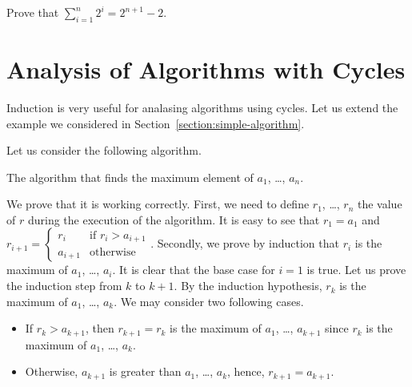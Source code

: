\begin{exercise}
  Prove that $\sum_{i = 1}^n 2^i = 2^{n + 1} - 2$.
\end{exercise}

\section{Analysis of Algorithms with Cycles}

Induction is very useful for analasing algorithms using cycles. Let us extend
the example we considered in Section~\ref{section:simple-algorithm}.

Let us consider the following algorithm.
\begin{algorithm}
  \begin{algorithmic}[1]
        \EndIf
      \EndFor
      \State{}
    \EndFunction
  \end{algorithmic}
  \caption{The algorithm that finds the maximum element of $a_1$, \dots, $a_n$.}
\end{algorithm}
We prove that it is working correctly. First, we need to define $r_1$,
\dots, $r_n$ the value of $r$ during the execution of the algorithm.
It is easy to see that $r_1 = a_1$ and
$
  r_{i + 1} =
  \begin{cases}
    r_i & \text{if } r_i > a_{i + 1} \\
    a_{i + 1} & \text{otherwise}
  \end{cases}
$.
Secondly, we prove by induction that $r_i$ is the maximum of $a_1$, \dots,
$a_i$. It is clear that the base case for $i = 1$ is true. Let us prove the
induction step from $k$ to $k + 1$. By the induction hypothesis, $r_k$
is the maximum of $a_1$, \dots, $a_k$. We may consider two following cases.
\begin{itemize}
  \item If $r_k > a_{k + 1}$, then $r_{k + 1} = r_{k}$ is the maximum of $a_1$,
    \dots, $a_{k + 1}$ since $r_k$ is the maximum of $a_1$, \dots, $a_k$.
  \item Otherwise, $a_{k + 1}$ is greater than $a_1$, \dots, $a_k$, hence,
    $r_{k + 1} = a_{k + 1}$.
\end{itemize}

